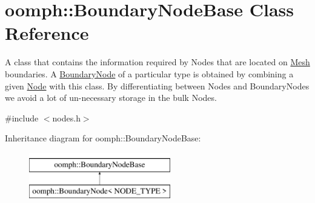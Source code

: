 \hypertarget{classoomph_1_1BoundaryNodeBase}{}\section{oomph\+:\+:Boundary\+Node\+Base Class Reference}
\label{classoomph_1_1BoundaryNodeBase}


A class that contains the information required by Nodes that are located on \hyperlink{classoomph_1_1Mesh}{Mesh} boundaries. A \hyperlink{classoomph_1_1BoundaryNode}{Boundary\+Node} of a particular type is obtained by combining a given \hyperlink{classoomph_1_1Node}{Node} with this class. By differentiating between Nodes and Boundary\+Nodes we avoid a lot of un-\/necessary storage in the bulk Nodes.  




{\ttfamily \#include $<$nodes.\+h$>$}

Inheritance diagram for oomph\+:\+:Boundary\+Node\+Base\+:\begin{figure}[H]
\begin{center}
\leavevmode
\includegraphics[height=2.000000cm]{classoomph_1_1BoundaryNodeBase}
\end{center}
\end{figure}
